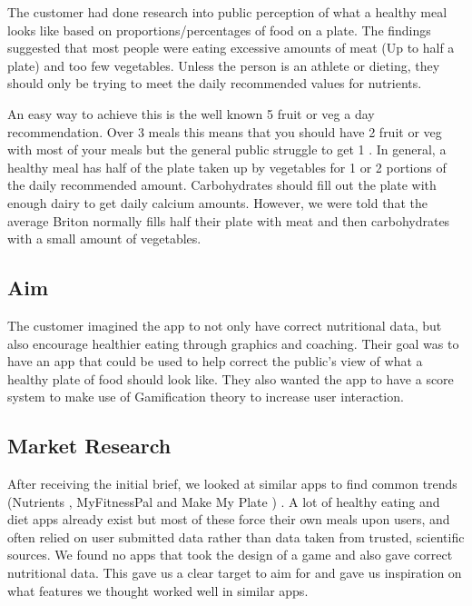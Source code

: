 \documentclass{l3proj}
\begin{document}
The customer had done research into public perception of what a healthy meal looks like based on proportions/percentages of food on a plate. The findings suggested that most people were eating excessive amounts of meat (Up to half a plate) and too few vegetables. Unless the person is an athlete or dieting, they should only be trying to meet the daily recommended values for nutrients.

An easy way to achieve this is the well known 5 fruit or veg a day recommendation. Over 3 meals this means that you should have 2 fruit or veg with most of your meals but the general public struggle to get 1 \cite{fruitveg}. In general, a healthy meal has half of the plate taken up by vegetables for 1 or 2 portions of the daily recommended amount. Carbohydrates should fill out the plate with enough dairy to get daily calcium amounts. However, we were told that the average Briton normally fills half their plate with meat and then carbohydrates with a small amount of vegetables. 

\subsection{Aim}
The customer imagined the app to not only have correct nutritional data, but also encourage healthier eating through graphics and coaching. Their goal was to have an app that could be used to help correct the public's view of what a healthy plate of food should look like. They also wanted the app to have a score system to make use of Gamification theory \cite{gamification} to increase user interaction. 

\subsection{Market Research}
After receiving the initial brief, we looked at similar apps to find common trends (Nutrients \cite{nutr}, MyFitnessPal \cite{myfitpal} and Make My Plate \cite{plate}) . A lot of healthy eating and diet apps already exist but most of these force their own meals upon users, and often relied on user submitted data rather than data taken from trusted, scientific sources. We found no apps that took the design of a game and also gave correct nutritional data. This gave us a clear target to aim for and gave us inspiration on what features we thought worked well in similar apps.
\end{document}
